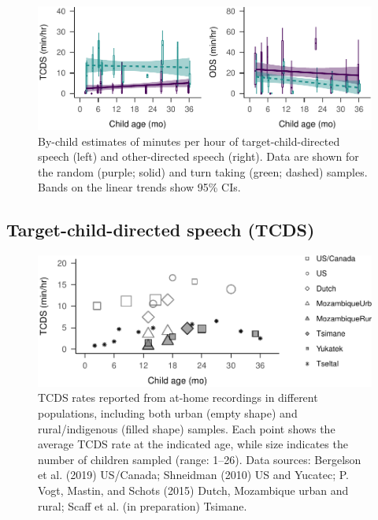 \documentclass[floatsintext,man]{apa6}
\theoremstyle{definition}
\theoremstyle{definition}
\theoremstyle{definition}
\theoremstyle{remark}
\begin{document}
\begin{figure}
\centering
\includegraphics{Tseltal-CLE_files/figure-latex/fig3-1.pdf}
\caption{\label{fig:fig3}By-child estimates of minutes per hour of
target-child-directed speech (left) and other-directed speech (right).
Data are shown for the random (purple; solid) and turn taking (green;
dashed) samples. Bands on the linear trends show 95\% CIs.}
\end{figure}

\subsection{Target-child-directed speech
(TCDS)}\label{target-child-directed-speech-tcds}

\begin{figure}
\centering
\includegraphics{Tseltal-CLE_files/figure-latex/fig4-1.pdf}
\caption{\label{fig:fig4}TCDS rates reported from at-home recordings in
different populations, including both urban (empty shape) and
rural/indigenous (filled shape) samples. Each point shows the average
TCDS rate at the indicated age, while size indicates the number of
children sampled (range: 1--26). Data sources: Bergelson et al. (2019)
US/Canada; Shneidman (2010) US and Yucatec; P. Vogt, Mastin, and Schots
(2015) Dutch, Mozambique urban and rural; Scaff et al. (in preparation)
Tsimane.}
\end{figure}
\end{document}
